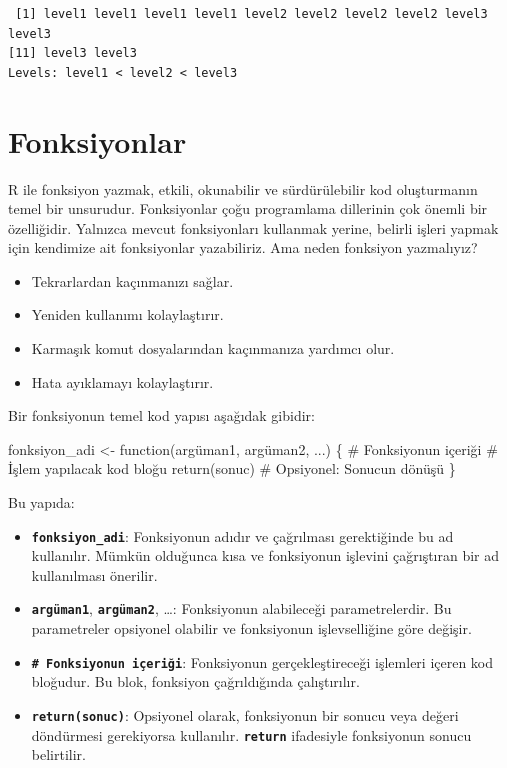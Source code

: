 \documentclass[
  letterpaper,
  DIV=11,
  numbers=noendperiod]{scrreprt}
\newenvironment{Shaded}{\begin{snugshade}}{\end{snugshade}}
\newcommand{\CommentTok}[1]{\textcolor[rgb]{0.37,0.37,0.37}{#1}}
\newcommand{\ControlFlowTok}[1]{\textcolor[rgb]{0.00,0.23,0.31}{#1}}
\newcommand{\FunctionTok}[1]{\textcolor[rgb]{0.28,0.35,0.67}{#1}}
\newcommand{\NormalTok}[1]{\textcolor[rgb]{0.00,0.23,0.31}{#1}}
\newcommand{\OtherTok}[1]{\textcolor[rgb]{0.00,0.23,0.31}{#1}}
\begin{document}
\begin{verbatim}
 [1] level1 level1 level1 level1 level2 level2 level2 level2 level3 level3
[11] level3 level3
Levels: level1 < level2 < level3
\end{verbatim}

\chapter{Fonksiyonlar}\label{fonksiyonlar}

R ile fonksiyon yazmak, etkili, okunabilir ve sürdürülebilir kod
oluşturmanın temel bir unsurudur. Fonksiyonlar çoğu programlama
dillerinin çok önemli bir özelliğidir. Yalnızca mevcut fonksiyonları
kullanmak yerine, belirli işleri yapmak için kendimize ait fonksiyonlar
yazabiliriz. Ama neden fonksiyon yazmalıyız?

\begin{itemize}
\item
  Tekrarlardan kaçınmanızı sağlar.
\item
  Yeniden kullanımı kolaylaştırır.
\item
  Karmaşık komut dosyalarından kaçınmanıza yardımcı olur.
\item
  Hata ayıklamayı kolaylaştırır.
\end{itemize}

Bir fonksiyonun temel kod yapısı aşağıdak gibidir:

\begin{Shaded}
\begin{Highlighting}[]
\NormalTok{fonksiyon\_adi }\OtherTok{\textless{}{-}} \ControlFlowTok{function}\NormalTok{(argüman1, argüman2, ...) \{}
  \CommentTok{\# Fonksiyonun içeriği}
  \CommentTok{\# İşlem yapılacak kod bloğu}
  \FunctionTok{return}\NormalTok{(sonuc)  }\CommentTok{\# Opsiyonel: Sonucun dönüşü}
\NormalTok{\}}
\end{Highlighting}
\end{Shaded}

Bu yapıda:

\begin{itemize}
\item
  \textbf{\texttt{fonksiyon\_adi}}: Fonksiyonun adıdır ve çağrılması
  gerektiğinde bu ad kullanılır. Mümkün olduğunca kısa ve fonksiyonun
  işlevini çağrıştıran bir ad kullanılması önerilir.
\item
  \textbf{\texttt{argüman1}}, \textbf{\texttt{argüman2}}, \ldots:
  Fonksiyonun alabileceği parametrelerdir. Bu parametreler opsiyonel
  olabilir ve fonksiyonun işlevselliğine göre değişir.
\item
  \textbf{\texttt{\#\ Fonksiyonun\ içeriği}}: Fonksiyonun
  gerçekleştireceği işlemleri içeren kod bloğudur. Bu blok, fonksiyon
  çağrıldığında çalıştırılır.
\item
  \textbf{\texttt{return(sonuc)}}: Opsiyonel olarak, fonksiyonun bir
  sonucu veya değeri döndürmesi gerekiyorsa kullanılır.
  \textbf{\texttt{return}} ifadesiyle fonksiyonun sonucu belirtilir.
\end{itemize}
\end{document}
